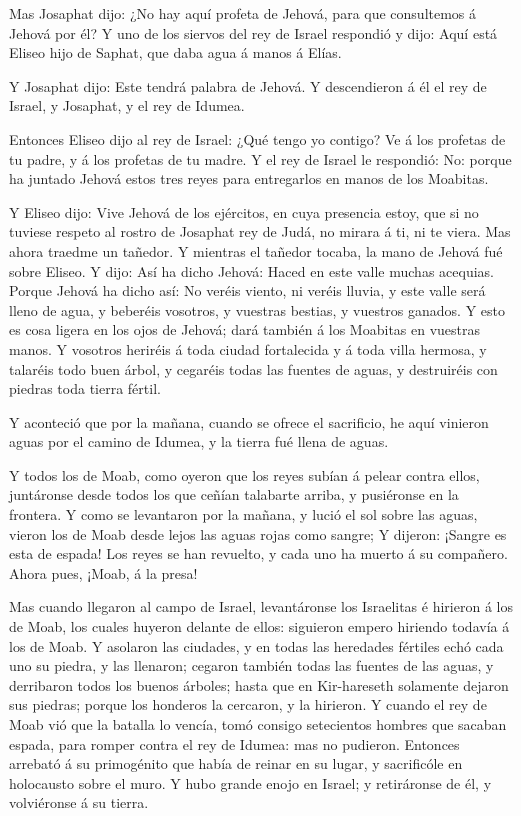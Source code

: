  Mas Josaphat dijo: ¿No hay aquí profeta de Jehová, para
que consultemos á Jehová por él? Y uno de los siervos del rey de Israel
respondió y dijo: Aquí está Eliseo hijo de Saphat, que daba agua á manos
á Elías.

 Y Josaphat dijo: Este tendrá palabra de Jehová. Y
descendieron á él el rey de Israel, y Josaphat, y el rey de Idumea.

 Entonces Eliseo dijo al rey de Israel: ¿Qué tengo yo
contigo? Ve á los profetas de tu padre, y á los profetas de tu madre. Y
el rey de Israel le respondió: No: porque ha juntado Jehová estos tres
reyes para entregarlos en manos de los Moabitas.

 Y Eliseo dijo: Vive Jehová de los ejércitos, en cuya
presencia estoy, que si no tuviese respeto al rostro de Josaphat rey de
Judá, no mirara á ti, ni te viera.  Mas ahora traedme un
tañedor. Y mientras el tañedor tocaba, la mano de Jehová fué sobre
Eliseo.  Y dijo: Así ha dicho Jehová: Haced en este valle
muchas acequias.  Porque Jehová ha dicho así: No veréis
viento, ni veréis lluvia, y este valle será lleno de agua, y beberéis
vosotros, y vuestras bestias, y vuestros ganados.  Y esto
es cosa ligera en los ojos de Jehová; dará también á los Moabitas en
vuestras manos.  Y vosotros heriréis á toda ciudad
fortalecida y á toda villa hermosa, y talaréis todo buen árbol, y
cegaréis todas las fuentes de aguas, y destruiréis con piedras toda
tierra fértil.

 Y aconteció que por la mañana, cuando se ofrece el
sacrificio, he aquí vinieron aguas por el camino de Idumea, y la tierra
fué llena de aguas.

 Y todos los de Moab, como oyeron que los reyes subían á
pelear contra ellos, juntáronse desde todos los que ceñían talabarte
arriba, y pusiéronse en la frontera.  Y como se levantaron
por la mañana, y lució el sol sobre las aguas, vieron los de Moab desde
lejos las aguas rojas como sangre;  Y dijeron: ¡Sangre es
esta de espada! Los reyes se han revuelto, y cada uno ha muerto á su
compañero. Ahora pues, ¡Moab, á la presa!

 Mas cuando llegaron al campo de Israel, levantáronse los
Israelitas é hirieron á los de Moab, los cuales huyeron delante de
ellos: siguieron empero hiriendo todavía á los de Moab.  Y
asolaron las ciudades, y en todas las heredades fértiles echó cada uno
su piedra, y las llenaron; cegaron también todas las fuentes de las
aguas, y derribaron todos los buenos árboles; hasta que en Kir-hareseth
solamente dejaron sus piedras; porque los honderos la cercaron, y la
hirieron.  Y cuando el rey de Moab vió que la batalla lo
vencía, tomó consigo setecientos hombres que sacaban espada, para romper
contra el rey de Idumea: mas no pudieron.  Entonces
arrebató á su primogénito que había de reinar en su lugar, y sacrificóle
en holocausto sobre el muro. Y hubo grande enojo en Israel; y
retiráronse de él, y volviéronse á su tierra.

